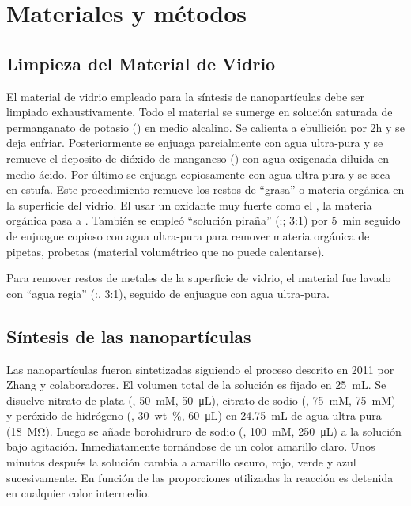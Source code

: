 \section{Materiales y métodos}

\subsection{Limpieza del Material de Vidrio}
El material de vidrio empleado para la síntesis de nanopartículas debe ser limpiado exhaustivamente. Todo el material se sumerge en solución saturada de permanganato de potasio () en medio alcalino. Se calienta a ebullición por 2h y se deja enfriar. Posteriormente se enjuaga parcialmente con agua ultra-pura y se remueve el deposito de dióxido de manganeso () con agua oxigenada diluida en medio ácido. Por último se enjuaga copiosamente con agua ultra-pura y se seca en estufa. Este procedimiento remueve los restos de ``grasa'' o materia orgánica en la superficie del vidrio. El usar un oxidante muy fuerte como el , la materia orgánica pasa a . También se empleó ``solución piraña'' (:; 3:1) por \qty{5}{\minute} seguido de enjuague copioso con agua ultra-pura para remover materia orgánica de pipetas, probetas (material volumétrico que no puede calentarse).

Para remover restos de metales de la superficie de vidrio, el material fue lavado con ``agua regia'' (:, 3:1), seguido de enjuague con agua ultra-pura.

\subsection{Síntesis de las nanopartículas}

Las nanopartículas fueron sintetizadas siguiendo el proceso descrito en 2011 por Zhang y colaboradores.\cite{zhang2011} 
El volumen total de la solución es fijado en \qty{25}{\milli\liter}.
Se disuelve nitrato de plata (, \qty{50}{\milli M}, \qty{50}{\micro\liter}), citrato de sodio (, \qty{75}{\milli M}, \qty{75}{\milli M}) y peróxido de hidrógeno (, \qty{30}{wt\percent}, \qty{60}{\micro\liter}) en \qty{24.75}{\milli\liter} de agua ultra pura (\SI{18}{\mega\ohm}).
Luego se añade borohidruro de sodio (, \qty{100}{mM}, \qty{250}{\micro L}) a la solución bajo agitación.
Inmediatamente tornándose de un color amarillo claro. 
Unos minutos después la solución cambia a amarillo oscuro, rojo, verde y azul sucesivamente.
En función de las proporciones utilizadas la reacción es detenida en cualquier color intermedio.

